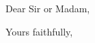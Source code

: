 \documentclass[11pt,a4paper,sans]{moderncv}        %
\begin{document}
\clearpage
\date{January 08, 2017}
\opening{Dear Sir or Madam,}
\closing{Yours faithfully,}





\end{document}
